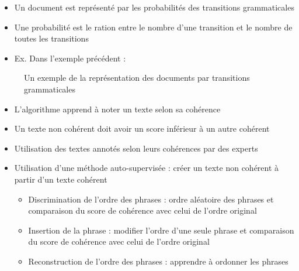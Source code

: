 \documentclass{KodeBook}
\begin{document}
\begin{itemize}
	\item Un document est représenté par les probabilités des transitions grammaticales
	\item Une probabilité est le ration entre le nombre d'une transition et le nombre de toutes les transitions
	\item Ex. Dans l'exemple précédent : 
\end{itemize}
\begin{figure}
	\caption{Un exemple de la représentation des documents par transitions grammaticales \cite{2008-barzilay-lapata}}
\end{figure}

\begin{itemize}
	\item L'algorithme apprend à noter un texte selon sa cohérence
	\item Un texte non cohérent doit avoir un score inférieur à un autre cohérent
	\item Utilisation des textes annotés selon leurs cohérences par des experts
	\item Utilisation d'une méthode auto-supervisée : créer un texte non cohérent à partir d'un texte cohérent
	\begin{itemize}
		\item Discrimination de l'ordre des phrases : ordre aléatoire des phrases et comparaison du score de cohérence avec celui de l'ordre original
		\item Insertion de la phrase : modifier l'ordre d'une seule phrase et comparaison du score de cohérence avec celui de l'ordre original
		\item Reconstruction de l'ordre des phrases : apprendre à ordonner les phrases
	\end{itemize}
\end{itemize}



\begin{discussion}



\end{discussion}

\ifx\wholebook\relax\else
% 
% 
	
\end{document}

